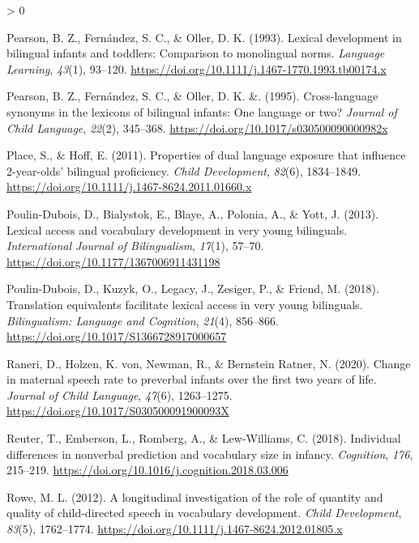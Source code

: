 \documentclass[
  english,
  ,man,floatsintext]{apa6}
\newlength{\cslhangindent}
\newenvironment{CSLReferences}[2] %
 {%
  \setlength{\parindent}{0pt}
  \ifodd #1 \everypar{\setlength{\hangindent}{\cslhangindent}}\ignorespaces\fi
  \ifnum #2 > 0
  \setlength{\parskip}{#2\baselineskip}
  \fi
 }%
 {}
\begin{document}
\begin{CSLReferences}{1}{0}
\leavevmode\hypertarget{ref-Pearson_etal_1993}{}%
Pearson, B. Z., Fernández, S. C., \& Oller, D. K. (1993). Lexical development in bilingual infants and toddlers: Comparison to monolingual norms. \emph{Language Learning}, \emph{43}(1), 93--120. \url{https://doi.org/10.1111/j.1467-1770.1993.tb00174.x}

\leavevmode\hypertarget{ref-Pearson_etal_1995}{}%
Pearson, B. Z., Fernández, S. C., \& Oller, D. K. \&. (1995). Cross-language synonyms in the lexicons of bilingual infants: One language or two? \emph{Journal of Child Language}, \emph{22}(2), 345--368. \url{https://doi.org/10.1017/s030500090000982x}

\leavevmode\hypertarget{ref-Place_Hoff_2011}{}%
Place, S., \& Hoff, E. (2011). Properties of dual language exposure that influence 2-year-olds' bilingual proficiency. \emph{Child Development}, \emph{82}(6), 1834--1849. \url{https://doi.org/10.1111/j.1467-8624.2011.01660.x}

\leavevmode\hypertarget{ref-Poulin-Dubois_etal_2013}{}%
Poulin-Dubois, D., Bialystok, E., Blaye, A., Polonia, A., \& Yott, J. (2013). Lexical access and vocabulary development in very young bilinguals. \emph{International Journal of Bilingualism}, \emph{17}(1), 57--70. \url{https://doi.org/10.1177/1367006911431198}

\leavevmode\hypertarget{ref-Poulin-Dubois_etal_2018}{}%
Poulin-Dubois, D., Kuzyk, O., Legacy, J., Zesiger, P., \& Friend, M. (2018). Translation equivalents facilitate lexical access in very young bilinguals. \emph{Bilingualism: Language and Cognition}, \emph{21}(4), 856--866. \url{https://doi.org/10.1017/S1366728917000657}

\leavevmode\hypertarget{ref-Raneri_etal_2020}{}%
Raneri, D., Holzen, K. von, Newman, R., \& Bernstein Ratner, N. (2020). Change in maternal speech rate to preverbal infants over the first two years of life. \emph{Journal of Child Language}, \emph{47}(6), 1263--1275. \url{https://doi.org/10.1017/S030500091900093X}

\leavevmode\hypertarget{ref-Reuter_etal_2018}{}%
Reuter, T., Emberson, L., Romberg, A., \& Lew-Williams, C. (2018). Individual differences in nonverbal prediction and vocabulary size in infancy. \emph{Cognition}, \emph{176}, 215--219. \url{https://doi.org/10.1016/j.cognition.2018.03.006}

\leavevmode\hypertarget{ref-Rowe_2012}{}%
Rowe, M. L. (2012). A longitudinal investigation of the role of quantity and quality of child-directed speech in vocabulary development. \emph{Child Development}, \emph{83}(5), 1762--1774. \url{https://doi.org/10.1111/j.1467-8624.2012.01805.x}


\end{CSLReferences}
\end{document}
